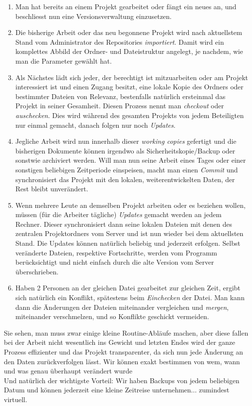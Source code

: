\documentclass[b5paper,10pt,dvips,fleqn,titlepage,twoside]{book}
\begin{document}
\begin{enumerate}
 \item Man hat bereits an einem Projekt gearbeitet oder fängt ein neues an, und beschliesst nun eine Versionsverwaltung einzusetzen.
\item Die bisherige Arbeit oder das neu begonnene Projekt wird nach aktuellstem Stand vom Administrator des Repositories \emph{importiert}. Damit wird ein komplettes Abbild der Ordner- und Dateistruktur angelegt, je nachdem, wie man die Parameter gewählt hat.
\item Als Nächstes lädt sich jeder, der berechtigt ist mitzuarbeiten oder am Projekt interessiert ist und einen Zugang besitzt, eine lokale Kopie des Ordners oder bestimmter Dateien von Relevanz, bestenfalls natürlich ersteinmal das Projekt in seiner Gesamheit.
Diesen Prozess nennt man \emph{checkout} oder \emph{auschecken}. Dies wird während des gesamten Projekts von jedem Beteiligten nur einmal gemacht, danach folgen nur noch \emph{Updates}.
\item Jegliche Arbeit wird nun innerhalb dieser \emph{working copies} gefertigt und die bisherigen Dokumente können irgendwo als Sicherheitskopie/Backup oder sonstwie archiviert werden. Will man nun seine Arbeit eines Tages oder einer sonstigen beliebigen Zeitperiode einspeisen, macht man einen \emph{Commit} und synchronisiert das Projekt mit den lokalen, weiterentwickelten Daten, der Rest bleibt unverändert.
\item Wenn mehrere Leute an demselben Projekt arbeiten oder es beziehen wollen, müssen (für die Arbeiter tägliche) \emph{Updates} gemacht werden an jedem Rechner. Dieser synchronisiert dann seine lokalen Dateien mit denen des zentralen Projektordners vom Server und ist nun wieder bei dem aktuellsten Stand. Die Updates können natürlich beliebig und jederzeit erfolgen. Selbst veränderte Dateien, respektive Fortschritte, werden vom Programm berücksichtigt und nicht einfach durch die alte Version vom Server überschrieben.
\item Haben 2 Personen an der gleichen Datei gearbeitet zur gleichen Zeit, ergibt sich natürlich ein Konflikt, spätestens beim \emph{Einchecken} der Datei. Man kann dann die Änderungen der Dateien miteinander vergleichen und \emph{mergen}, miteinander verschmelzen, und so Konflikte geschickt vermeiden.
\end{enumerate}

Sie sehen, man muss zwar einige kleine Routine-Abläufe machen, aber diese fallen bei der Arbeit nicht wesentlich ins Gewicht und letzten Endes wird der ganze Prozess effizienter und das Projekt transparenter, da sich nun jede Änderung an den Daten zurückverfolgen lässt.
Wir können exakt bestimmen von wem, wann und was genau überhaupt verändert wurde 
\\
Und natürlich der wichtigste Vorteil: Wir haben Backups von jedem beliebigen Datum und können jederzeit eine kleine Zeitreise unternehmen... zumindest virtuell.
\newpage
\end{document}
